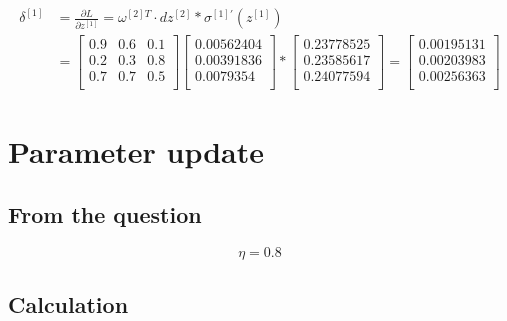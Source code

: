 \documentclass{article}
\begin{document}
\[
    \begin{aligned}
        \delta^{[1]} & = \frac{\partial L}{\partial z^{[1]}} = \omega^{[2]T}\cdot dz^{[2]}*\sigma^{[1]'}(z^{[1]}) \\
                     & = \begin{bmatrix}
                             0.9 & 0.6 & 0.1 \\
                             0.2 & 0.3 & 0.8 \\
                             0.7 & 0.7 & 0.5 \\
                         \end{bmatrix}
        \begin{bmatrix}
            0.00562404 \\
            0.00391836 \\
            0.0079354  \\
        \end{bmatrix}
        * \begin{bmatrix}
              0.23778525 \\
              0.23585617 \\
              0.24077594 \\
          \end{bmatrix}
        = \begin{bmatrix}
              0.00195131 \\
              0.00203983 \\
              0.00256363 \\
          \end{bmatrix}
    \end{aligned}
\]

\section{Parameter update}

\subsection{From the question}

\[
    \eta = 0.8
\]

\subsection{Calculation}
\end{document}
